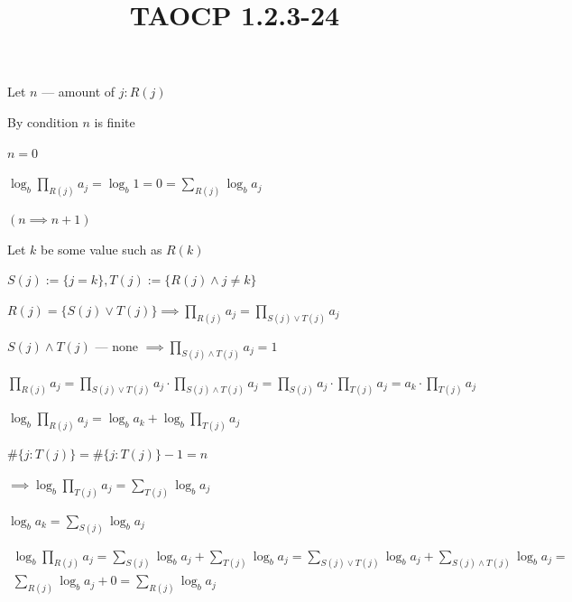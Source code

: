 \documentclass{article}
\title{TAOCP 1.2.3\mbox{-}24}
\begin{document}
\maketitle

Let \( n \) --- amount of \( j: R(j) \)

By condition \( n \) is finite

\( n = 0 \)

\( \log_{b} \prod_{R(j)} a_{j} = \log_{b} 1 = 0 = \sum_{R(j)} \log_{b} a_{j} \)

\( (n \implies n + 1) \)

Let \( k \) be some value such as \( R(k) \)

\( S(j) := \{ j = k \}, T(j) := \{ R(j) \land j \neq k \} \)

\( R(j) = \{ S(j) \lor T(j) \} \implies \prod_{R(j)} a_{j} = \prod_{S(j) \lor T(j)} a_{j} \)

\( S(j) \land T(j) \) --- none \( \implies \prod_{S(j) \land T(j)} a_{j} = 1 \)

\( \prod_{R(j)} a_{j} = \prod_{S(j) \lor T(j)} a_{j} \cdot \prod_{S(j) \land T(j)} a_{j} = \prod_{S(j)} a_{j} \cdot \prod_{T(j)} a_{j} = a_{k} \cdot \prod_{T(j)} a_{j} \)

\( \log_{b}\prod_{R(j)} a_{j} = \log_b{a_{k}} + \log_{b}\prod_{T(j)} a_{j} \)

\( \#\{ j: T(j) \} = \#\{ j: T(j) \} - 1 = n \)

\( \implies \log_{b}\prod_{T(j)} a_{j} = \sum_{T(j)} \log_b{a_{j}} \)

\( \log_b{a_{k}} = \sum_{S(j)} \log_b{a_{j}} \)

\begin{multline*}
\log_{b}\prod_{R(j)} a_{j} = \sum_{S(j)} \log_b{a_{j}} + \sum_{T(j)} \log_b{a_{j}} = \sum_{S(j) \lor T(j)} \log_b{a_{j}} + \sum_{S(j) \land T(j)} \log_b{a_{j}} = \\
\sum_{R(j)} \log_b{a_{j}} + 0 = \sum_{R(j)} \log_b{a_{j}}
\end{multline*}
\end{document}
